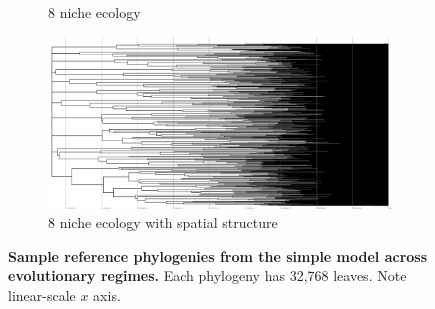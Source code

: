 \begin{figure}
\begin{subfigure}[b]{0.5\columnwidth}
    \caption{%
      8 niche ecology}
  \end{subfigure}
  \hfill
  \begin{subfigure}[b]{0.5\columnwidth}
    \includegraphics[height=0.12\textheight,width=\textwidth]{img/perfect-tree-phylogenies-log/epoch=7+resolution=3+treatment=18.pdf}
    \caption{%
      8 niche ecology with spatial structure}
  \end{subfigure}
  \hfill
  \caption{%
    \textbf{Sample reference phylogenies from the simple model across evolutionary regimes.}
    Each phylogeny has 32,768 leaves.
    Note linear-scale $x$ axis.
  }
  \label{fig:perfect-tree-phylogenies-nonlog}
\end{figure}


